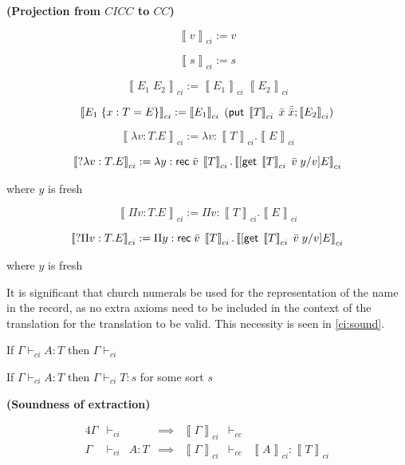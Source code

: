 \newcommand{\CICCproj}[1]{ \left\llbracket #1 \right\rrbracket_{ci}}

\begin{definition}
\textbf{ (Projection from $CICC$ to $CC$) }

\[
\CICCproj{v} := v
\]

\[
\CICCproj{s} := s
\]

\[
\CICCproj{E_1 \; E_2} := \CICCproj{E_1} \; \CICCproj{E_2}
\]

\[
\CICCproj{E_1 \; \{ x : T = E \}} := \CICCproj{E_1} \; (\m{put}\;\CICCproj{T}\;\bar{x}\; \bar{\bar{x}}; \CICCproj{E_2} )
\]

\[
\CICCproj{\lambda v : T . E } := \lambda v : \CICCproj{T} . \CICCproj{E}
\]

\[
\CICCproj{?\lambda v : T . E } := \lambda y : \m{rec}\;\bar{v}\; \CICCproj{T} . \CICCproj{ [ \m{get}\; \CICCproj{T}\; \bar{v}\; y  / v ] E}
\] 

where $y$ is fresh

\[
\CICCproj{\Pi v : T . E } := \Pi v : \CICCproj{T} . \CICCproj{E}
\]

\[
\CICCproj{?\Pi v : T . E } := \Pi y : \m{rec}\;\bar{v}\;\CICCproj{T} . \CICCproj{ [ \m{get}\;\CICCproj{T}\; \bar{v}\; y  / v ] E}
\]

where $y$ is fresh

\label{cicc:proj}
\end{definition}

It is significant that church numerals be used for the representation of the name in the record, 
as no extra axioms need to be included in the context of the translation for the translation to be valid.  
This necessity is seen in \ref{ci:sound}.

\begin{lemma}

If $\Gamma \vdash_{ci} A : T$ then $\Gamma \vdash_{ci}$

\label{ci:wfctxt}
\end{lemma}

\begin{lemma}

If $\Gamma \vdash_{ci} A : T$ then $\Gamma \vdash_{ci} T : s$ for some sort $s$

\label{ci:wtt}
\end{lemma}

\begin{theorem}

\textbf{(Soundness of extraction)}  

\begin{alignat}{4}
\Gamma &\vdash_{ci}&  & \implies & \CICCproj{\Gamma} & \vdash_{cc} &
\\
\Gamma &\vdash_{ci}& A : T & \implies & \CICCproj{\Gamma} & \vdash_{cc} & \CICCproj{A} : \CICCproj{ T }
\end{alignat}

\label{ci:sound}
\end{theorem}

